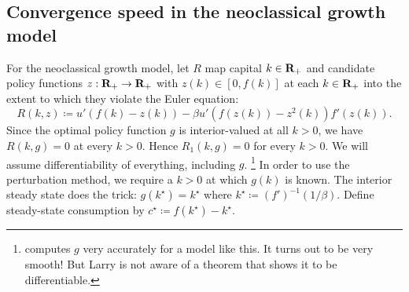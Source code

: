 \documentclass[11pt,letterpaper,reqno,oneside]{article}
\begin{document}
\subsection{Convergence speed in the neoclassical growth model}
\label{sec:07Oct2015:speed_convergence_neoclassical}

For the neoclassical growth model, let $R$ map capital $k \in \mathbf{R}_+$ and candidate policy functions $z : \mathbf{R}_+ \to \mathbf{R}_+$ with $z(k) \in [0,f(k)]$ at each $k \in \mathbf{R}_+$ into the extent to which they violate the Euler equation:
%
\begin{equation*}
	R(k,z) \coloneqq u'( f(k) - z(k) ) 
	- \beta u'\left( f(z(k)) - z^2(k) \right) f'(z(k)) .
\end{equation*}
%
Since the optimal policy function $g$ is interior-valued at all $k>0$, we have $R(k,g) = 0$ at every $k>0$. Hence $R_1(k,g) = 0$ for every $k > 0$. We will assume differentiability of everything, including $g$.%
	\footnote{\textcite{Christiano1989} computes $g$ very accurately for a model like this. It turns out to be very smooth! But Larry is not aware of a theorem that shows it to be differentiable.}
In order to use the perturbation method, we require a $k>0$ at which $g(k)$ is known. The interior steady state does the trick: $g(k^\star) = k^\star$ where $k^\star \coloneqq (f')^{-1}(1/\beta)$. Define steady-state consumption by $c^\star \coloneqq f(k^\star) - k^\star$.
\end{document}
